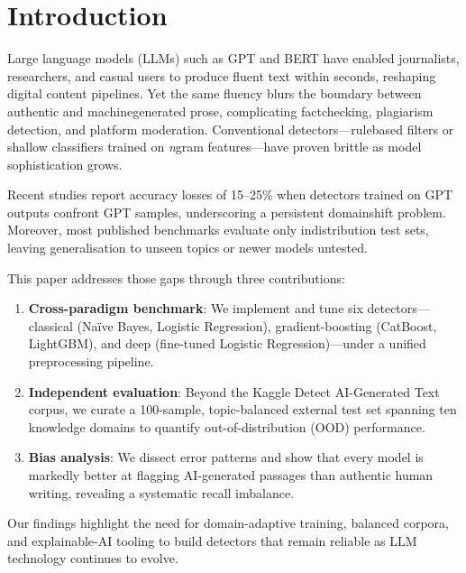 
\section{Introduction}  %

Large language models (LLMs) such as GPT and BERT have enabled journalists, researchers, and casual users to produce fluent text within seconds, reshaping digital content pipelines. Yet the same fluency blurs the boundary between authentic and machine\textendash generated prose, complicating fact\textendash checking, plagiarism detection, and platform moderation. Conventional detectors---rule\textendash based filters or shallow classifiers trained on \emph{n}\textendash gram features---have proven brittle as model sophistication grows.

Recent studies report accuracy losses of 15--25\% when detectors trained on GPT outputs confront GPT samples, underscoring a persistent domain\textendash shift problem. Moreover, most published benchmarks evaluate only in\textendash distribution test sets, leaving generalisation to unseen topics or newer models untested.

This paper addresses those gaps through three contributions:

\begin{enumerate}  %
    \item \textbf{Cross-paradigm benchmark}: We implement and tune six detectors---classical (Naïve Bayes, Logistic Regression), gradient-boosting (CatBoost, LightGBM), and deep (fine-tuned Logistic Regression)---under a unified preprocessing pipeline.
    \item \textbf{Independent evaluation}: Beyond the Kaggle Detect AI-Generated Text corpus, we curate a 100-sample, topic-balanced external test set spanning ten knowledge domains to quantify out-of-distribution (OOD) performance.
    \item \textbf{Bias analysis}: We dissect error patterns and show that every model is markedly better at flagging AI-generated passages than authentic human writing, revealing a systematic recall imbalance.
\end{enumerate}

Our findings highlight the need for domain-adaptive training, balanced corpora, and explainable-AI tooling to build detectors that remain reliable as LLM technology continues to evolve.
